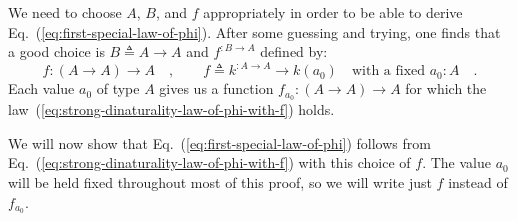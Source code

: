 We need to choose $A$, $B$, and $f$ appropriately in order to be
able to derive Eq.~(\ref{eq:first-special-law-of-phi}). After some
guessing and trying, one finds that a good choice is $B\triangleq A\rightarrow A$
and $f^{:B\rightarrow A}$ defined by:
\begin{equation}
f:(A\rightarrow A)\rightarrow A\quad,\quad\quad f\triangleq k^{:A\rightarrow A}\rightarrow k(a_{0})\quad\text{with a fixed }a_{0}:A\quad.\label{eq:f-for-relational-law-of-foldFn-derivation1}
\end{equation}
Each value $a_{0}$ of type $A$ gives us a function $f_{a_{0}}:(A\rightarrow A)\rightarrow A$
for which the law~(\ref{eq:strong-dinaturality-law-of-phi-with-f})
holds. 

We will now show that Eq.~(\ref{eq:first-special-law-of-phi}) follows
from Eq.~(\ref{eq:strong-dinaturality-law-of-phi-with-f}) with this
choice of $f$. The value $a_{0}$ will be held fixed throughout most
of this proof, so we will write just $f$ instead of $f_{a_{0}}$.

